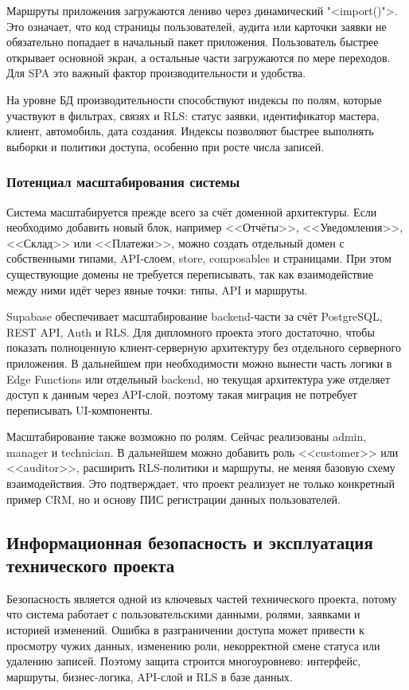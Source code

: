 Маршруты приложения загружаются лениво через динамический "<import()">. Это означает, что код страницы пользователей, аудита или карточки заявки не обязательно попадает в начальный пакет приложения. Пользователь быстрее открывает основной экран, а остальные части загружаются по мере переходов. Для SPA это важный фактор производительности и удобства.

На уровне БД производительности способствуют индексы по полям, которые участвуют в фильтрах, связях и RLS: статус заявки, идентификатор мастера, клиент, автомобиль, дата создания. Индексы позволяют быстрее выполнять выборки и политики доступа, особенно при росте числа записей.

\subsubsection{Потенциал масштабирования системы}

Система масштабируется прежде всего за счёт доменной архитектуры. Если необходимо добавить новый блок, например <<Отчёты>>, <<Уведомления>>, <<Склад>> или <<Платежи>>, можно создать отдельный домен с собственными типами, API-слоем, store, composables и страницами. При этом существующие домены не требуется переписывать, так как взаимодействие между ними идёт через явные точки: типы, API и маршруты.

Supabase обеспечивает масштабирование backend-части за счёт PostgreSQL, REST API, Auth и RLS. Для дипломного проекта этого достаточно, чтобы показать полноценную клиент-серверную архитектуру без отдельного серверного приложения. В дальнейшем при необходимости можно вынести часть логики в Edge Functions или отдельный backend, но текущая архитектура уже отделяет доступ к данным через API-слой, поэтому такая миграция не потребует переписывать UI-компоненты.

Масштабирование также возможно по ролям. Сейчас реализованы admin, manager и technician. В дальнейшем можно добавить роль <<customer>> или <<auditor>>, расширить RLS-политики и маршруты, не меняя базовую схему взаимодействия. Это подтверждает, что проект реализует не только конкретный пример CRM, но и основу ПИС регистрации данных пользователей.

\subsection{Информационная безопасность и эксплуатация технического проекта}

Безопасность является одной из ключевых частей технического проекта, потому что система работает с пользовательскими данными, ролями, заявками и историей изменений. Ошибка в разграничении доступа может привести к просмотру чужих данных, изменению роли, некорректной смене статуса или удалению записей. Поэтому защита строится многоуровнево: интерфейс, маршруты, бизнес-логика, API-слой и RLS в базе данных.

